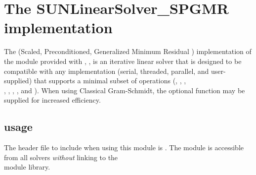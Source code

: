 \section{The SUNLinearSolver\_SPGMR implementation}\label{ss:sunlinsol_spgmr}

The {\spgmr} (Scaled, Preconditioned, Generalized Minimum
Residual \cite{SaSc:86}) implementation of the {\sunlinsol} module
provided with {\sundials}, {\sunlinsolspgmr}, is an iterative linear
solver that is designed to be compatible with any {\nvector}
implementation (serial, threaded, parallel, and user-supplied) that
supports a minimal subset of operations (, 
, , \\ \noindent {}, ,
, , and ).  When using
Classical Gram-Schmidt, the optional function 
may be supplied for increased efficiency.

\subsection{{\sunlinsolspgmr} usage}\label{ss:sunlinsol_spgmr_usage}

The header file to include when using this module 
is . The {\sunlinsolspgmr} module
is accessible from all {\sundials} solvers \textit{without}
linking to the \\ \noindent
{} module library.


